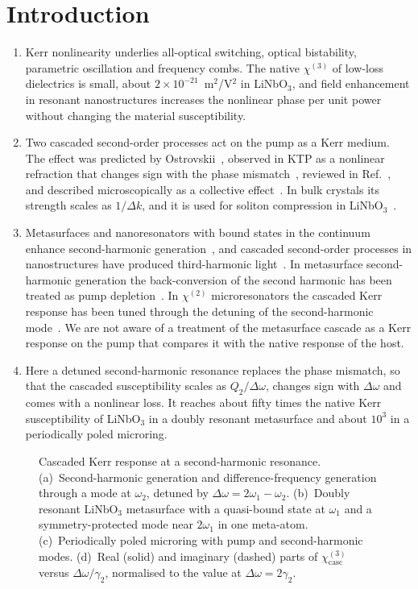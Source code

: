 \documentclass[aps,prapplied,onecolumn,superscriptaddress,longbibliography,nofootinbib]{revtex4-2}
\newcommand{\chitwo}{\chi^{(2)}}
\newcommand{\chithree}{\chi^{(3)}}
\newcommand{\chicasc}{\chi^{(3)}_{\mathrm{casc}}}
\newcommand{\Dom}{\Delta\omega}
\newcommand{\figbox}[1]{%
  \fbox{\parbox[c][#1][c]{0.92\linewidth}{\centering\small figure in preparation}}}
\begin{document}
\section{Introduction}

\begin{enumerate}
\item Kerr nonlinearity underlies all-optical switching, optical
  bistability, parametric oscillation and frequency combs.  The native
  $\chithree$ of low-loss dielectrics is small, about
  $2\times10^{-21}$~m$^2$/V$^2$ in LiNbO$_3$, and field enhancement in
  resonant nanostructures increases the nonlinear phase per unit power
  without changing the material susceptibility.
\item Two cascaded second-order processes act on the pump as a Kerr
  medium.  The effect was predicted by Ostrovskii~\cite{ostrovskii1967},
  observed in KTP as a nonlinear refraction that changes sign with the
  phase mismatch~\cite{desalvo1992}, reviewed in
  Ref.~\cite{stegeman1996}, and described microscopically as a collective
  effect~\cite{khurgin1997}.  In bulk crystals its strength scales as
  $1/\Delta k$, and it is used for soliton compression in
  LiNbO$_3$~\cite{bache2007josab,bache2007ol,bache2010}.
\item Metasurfaces and nanoresonators with bound states in the continuum
  enhance second-harmonic generation~\cite{carletti2018,koshelev2018,koshelev2020,anthur2020,fedotova2020},
  and cascaded second-order processes in nanostructures have produced
  third-harmonic light~\cite{gennaro2022,celebrano2019}.  In metasurface
  second-harmonic generation the back-conversion of the second harmonic
  has been treated as pump depletion~\cite{tu2024}.  In $\chitwo$
  microresonators the cascaded Kerr response has been tuned through the
  detuning of the second-harmonic mode~\cite{cui2022,cui2025,lu2023}.  We
  are not aware of a treatment of the metasurface cascade as a Kerr
  response on the pump that compares it with the native response of the
  host.
\item Here a detuned second-harmonic resonance replaces the phase
  mismatch, so that the cascaded susceptibility scales as $Q_2/\Dom$,
  changes sign with $\Dom$ and comes with a nonlinear loss.  It reaches
  about fifty times the native Kerr susceptibility of LiNbO$_3$ in a
  doubly resonant metasurface and about $10^3$ in a periodically poled
  microring.
\end{enumerate}

\begin{figure}[t]
  \centering
  \figbox{4.5cm}
  \caption{Cascaded Kerr response at a second-harmonic resonance.
    (a)~Second-harmonic generation and difference-frequency generation
    through a mode at $\omega_2$, detuned by $\Dom=2\omega_1-\omega_2$.
    (b)~Doubly resonant LiNbO$_3$ metasurface with a quasi-bound state at
    $\omega_1$ and a symmetry-protected mode near $2\omega_1$ in one meta-atom.
    (c)~Periodically poled microring with pump and second-harmonic modes.
    (d)~Real (solid) and imaginary (dashed) parts of $\chicasc$ versus
    $\Dom/\gamma_2$, normalised to the value at $\Dom=2\gamma_2$.}
  \label{fig:concept}
\end{figure}
\end{document}
